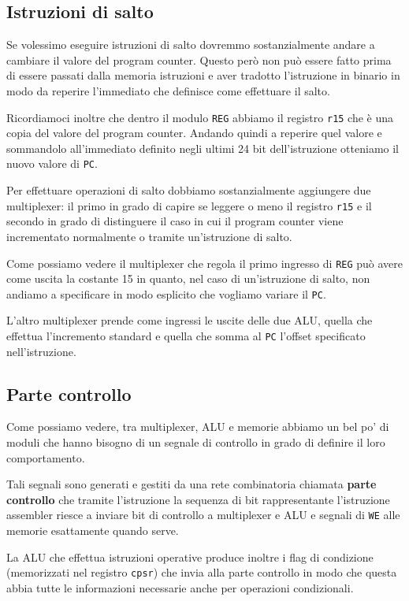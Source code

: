 \subsection{Istruzioni di salto}
Se volessimo eseguire istruzioni di salto dovremmo sostanzialmente andare a cambiare il valore del
program counter. Questo però non può essere fatto prima di essere passati dalla memoria istruzioni
e aver tradotto l'istruzione in binario in modo da reperire l'immediato che definisce come
effettuare il salto.

Ricordiamoci inoltre che dentro il modulo \verb|REG| abbiamo il registro \verb|r15| che è una copia
del valore del program counter. Andando quindi a reperire quel valore e sommandolo all'immediato
definito negli ultimi 24 bit dell'istruzione otteniamo il nuovo valore di \verb|PC|.

Per effettuare operazioni di salto dobbiamo sostanzialmente aggiungere due multiplexer: il primo in
grado di capire se leggere o meno il registro \verb|r15| e il secondo in grado di distinguere il
caso in cui il program counter viene incrementato normalmente o tramite un'istruzione di salto.
\begin{center}
	
\end{center}
Come possiamo vedere il multiplexer che regola il primo ingresso di \verb|REG| può avere come
uscita la costante 15 in quanto, nel caso di un'istruzione di salto, non andiamo a specificare in
modo esplicito che vogliamo variare il \verb|PC|.

L'altro multiplexer prende come ingressi le uscite delle due ALU, quella che effettua l'incremento
standard e quella che somma al \verb|PC| l'offset specificato nell'istruzione.

\subsection{Parte controllo}
Come possiamo vedere, tra multiplexer, ALU e memorie abbiamo un bel po' di moduli che hanno bisogno
di un segnale di controllo in grado di definire il loro comportamento.

Tali segnali sono generati e gestiti da una rete combinatoria chiamata \textbf{parte controllo} che
tramite l'istruzione la sequenza di bit rappresentante l'istruzione assembler riesce a inviare
bit di controllo a multiplexer e ALU e segnali di \verb|WE| alle memorie esattamente quando serve.

La ALU che effettua istruzioni operative produce inoltre i flag di condizione (memorizzati nel
registro \verb|cpsr|) che invia alla parte controllo in modo che questa abbia tutte le informazioni
necessarie anche per operazioni condizionali.
